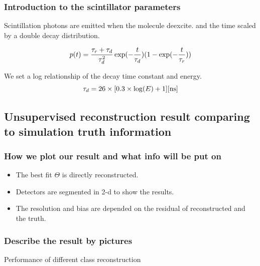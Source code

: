 \documentclass{article}
\begin{document}
\subsubsection{Introduction to the scintillator parameters}
\par Scintillation photons are emitted when the molecule deexcite. and the time scaled by a double decay distribution. 

	\begin{equation}
	\numberwithin{equation}{section}
		p(t) = \frac{\tau_r+\tau_d}{\tau_d^2}\exp(-\frac{t}{\tau_d})(1-\exp(-\frac{t}{\tau_r}))
	\end{equation}
	
\par We set a log relationship of the decay time constant and energy. 
	\begin{equation}
	\numberwithin{equation}{section}
		\tau_d = 26\times[0.3\times\log(E)+1] [\mathrm{ns}]
	\end{equation}
	
\subsection{Unsupervised reconstruction result comparing to simulation truth information}
\subsubsection{How we plot our result and what info will be put on}
\begin{itemize}
\item The best fit $\Theta$ is directly reconstructed. 
\item Detectors are segmented in 2-d to show the results.
\item The resolution and bias are depended on the residual of reconstructed and the truth.
\end{itemize} 

\subsubsection{Describe the result by pictures}
Performance of different class reconstruction
\end{document}
